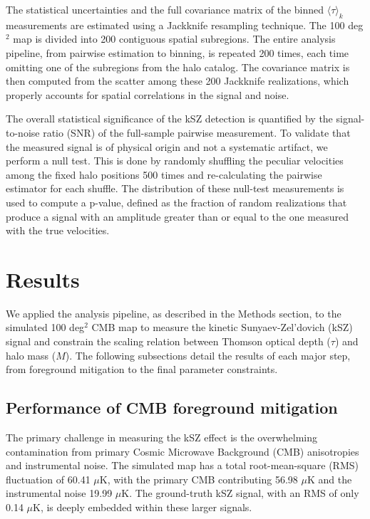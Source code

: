 \documentclass[]{article}
\begin{document}
The statistical uncertainties and the full covariance matrix of the binned $\langle \tau \rangle_k$ measurements are estimated using a Jackknife resampling technique. The 100 deg$^2$ map is divided into 200 contiguous spatial subregions. The entire analysis pipeline, from pairwise estimation to binning, is repeated 200 times, each time omitting one of the subregions from the halo catalog. The covariance matrix is then computed from the scatter among these 200 Jackknife realizations, which properly accounts for spatial correlations in the signal and noise.

The overall statistical significance of the kSZ detection is quantified by the signal-to-noise ratio (SNR) of the full-sample pairwise measurement. To validate that the measured signal is of physical origin and not a systematic artifact, we perform a null test. This is done by randomly shuffling the peculiar velocities among the fixed halo positions 500 times and re-calculating the pairwise estimator for each shuffle. The distribution of these null-test measurements is used to compute a p-value, defined as the fraction of random realizations that produce a signal with an amplitude greater than or equal to the one measured with the true velocities.

\section{Results}
\label{sec:results}
We applied the analysis pipeline, as described in the Methods section, to the simulated 100 deg$^2$ CMB map to measure the kinetic Sunyaev-Zel'dovich (kSZ) signal and constrain the scaling relation between Thomson optical depth ($\tau$) and halo mass ($M$). The following subsections detail the results of each major step, from foreground mitigation to the final parameter constraints.

\subsection{Performance of CMB foreground mitigation}

The primary challenge in measuring the kSZ effect is the overwhelming contamination from primary Cosmic Microwave Background (CMB) anisotropies and instrumental noise. The simulated map has a total root-mean-square (RMS) fluctuation of 60.41 $\mu$K, with the primary CMB contributing 56.98 $\mu$K and the instrumental noise 19.99 $\mu$K. The ground-truth kSZ signal, with an RMS of only 0.14 $\mu$K, is deeply embedded within these larger signals.
\end{document}
